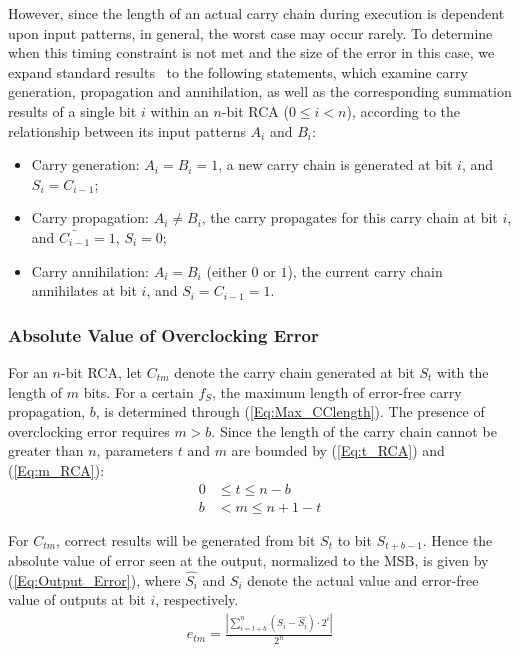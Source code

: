 \documentclass[prodmode,acmtrets]{acmsmall} %
\begin{document}
However, since the length of an actual carry chain during execution is dependent upon input patterns, in general, the worst case may occur rarely. To determine when this timing constraint is not met and the size of the error in this case, we expand standard results~\cite{DigitalICDesign} to the following statements, which examine carry generation, propagation and annihilation, as well as the corresponding summation results of a single bit $i$ within an $n$-bit RCA ($0\leq i<n$), according to the relationship between its input patterns $A_i$ and $B_i$:
%
 \begin{itemize}
   \item Carry generation: $A_i=B_i=1$, a new carry chain is generated at bit $i$, and $S_i=C_{i-1}$;
   \item Carry propagation: $A_i\neq B_i$, the carry propagates for this carry chain at bit $i$, and $\bar{C_{i-1}}=1$, $S_i=0$;
   \item Carry annihilation: $A_i=B_i$ (either $0$ or $1$), the current carry chain annihilates at bit $i$, and $S_i=C_{i-1}=1$.
 \end{itemize}

 \subsubsection{Absolute Value of Overclocking Error}
For an $n$-bit RCA, let $C_{tm}$ denote the carry chain generated at bit $S_t$ with the length of $m$ bits. For a certain $f_S$, the maximum length of error-free carry propagation, $b$, is determined through (\ref{Eq:Max_CClength}). The presence of overclocking error requires $m>b$. Since the length of the carry chain cannot be greater than $n$, parameters $t$ and $m$ are bounded by (\ref{Eq:t_RCA}) and (\ref{Eq:m_RCA}):
%
\begin{align}
  \label{Eq:t_RCA}  0&\leq t \leq n-b\\
    b&<m\leq n+1-t      \label{Eq:m_RCA}
\end{align}

For $C_{tm}$, correct results will be generated from bit $S_t$ to bit $S_{t+b-1}$. Hence the absolute value of error seen at the output, normalized to the MSB, is given by (\ref{Eq:Output_Error}), where $\hat{S_i}$ and $S_i$ denote the actual value and error-free value of outputs at bit $i$, respectively.
%
\begin{eqnarray}\label{Eq:Output_Error}
    e_{tm}=\frac{\left|\sum_{i=t+b}^{n}(S_i-\hat{S_i})\cdot 2^i\right|}{2^n}
\end{eqnarray}
\end{document}
